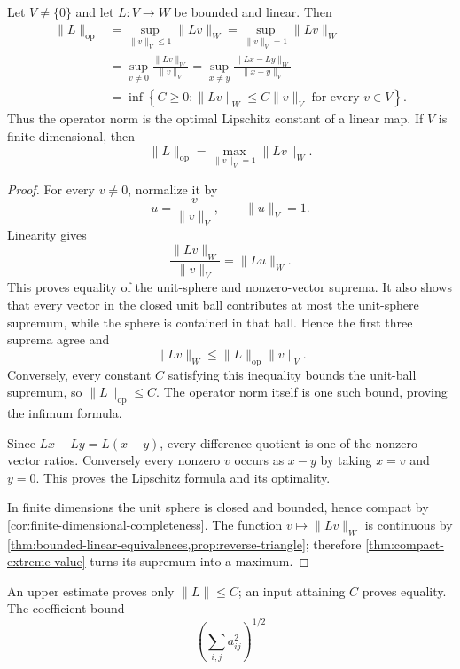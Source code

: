 \begin{theorem}
\label{thm:operator-norm-characterizations}
Let $V\ne\{0\}$ and let $L:V\to W$ be bounded and linear. Then
\[
\boxed{
\begin{aligned}
\|L\|_{\mathrm{op}}
&=\sup_{\|v\|_V\leq1}\|Lv\|_W
=\sup_{\|v\|_V=1}\|Lv\|_W\\
&=\sup_{v\ne0}\frac{\|Lv\|_W}{\|v\|_V}
=\sup_{x\ne y}\frac{\|Lx-Ly\|_W}{\|x-y\|_V}\\
&=\inf\left\{C\geq0:
\|Lv\|_W\leq C\|v\|_V\text{ for every }v\in V\right\}.
\end{aligned}}
\]
Thus the operator norm is the optimal Lipschitz constant of a linear map.
If $V$ is finite dimensional, then
\[
\|L\|_{\mathrm{op}}=\max_{\|v\|_V=1}\|Lv\|_W.
\]
\end{theorem}
\begin{proof}
For every $v\ne0$, normalize it by
\[
u=\frac{v}{\|v\|_V},\qquad \|u\|_V=1.
\]
Linearity gives
\[
\frac{\|Lv\|_W}{\|v\|_V}=\|Lu\|_W.
\]
This proves equality of the unit-sphere and nonzero-vector suprema. It also
shows that every vector in the closed unit ball contributes at most the
unit-sphere supremum, while the sphere is contained in that ball. Hence the
first three suprema agree and
\[
\|Lv\|_W\leq\|L\|_{\mathrm{op}}\|v\|_V.
\]
Conversely, every constant $C$ satisfying this inequality bounds the unit-ball
supremum, so $\|L\|_{\mathrm{op}}\leq C$. The operator norm itself is one
such bound, proving the infimum formula.

Since $Lx-Ly=L(x-y)$, every difference quotient is one of the nonzero-vector
ratios. Conversely every nonzero $v$ occurs as $x-y$ by taking $x=v$ and
$y=0$. This proves the Lipschitz formula and its optimality.

In finite dimensions the unit sphere is closed and bounded, hence compact by
\cref{cor:finite-dimensional-completeness}. The function
$v\mapsto\|Lv\|_W$ is continuous by
\cref{thm:bounded-linear-equivalences,prop:reverse-triangle}; therefore
\cref{thm:compact-extreme-value} turns its supremum into a maximum.
\end{proof}

An upper estimate proves only $\|L\|\leq C$; an input attaining $C$
proves equality. The coefficient bound
\[
(\sum_{i,j}a_{ij}^2)^{1/2}
\]

